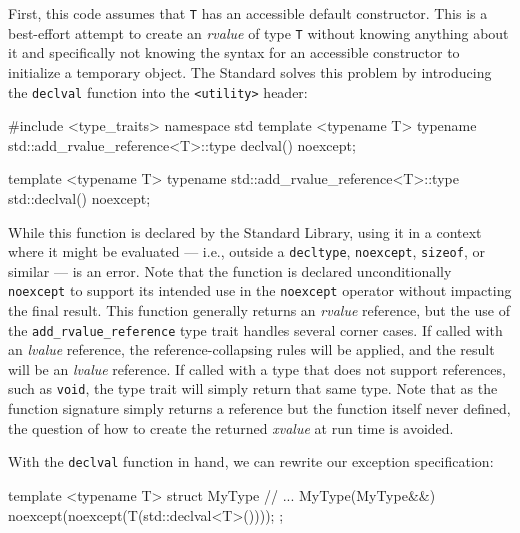 First, this code assumes that \lstinline!T! has an accessible default
constructor. This is a best-effort attempt to create an \emph{rvalue} of
type \lstinline!T! without knowing anything about it and specifically not
knowing the syntax for an accessible constructor to initialize a
temporary object. The Standard solves this problem by introducing the
\lstinline!declval! function into the \lstinline!<utility>! header:

\begin{emcppshiddenlisting}[emcppsbatch={e26,e27}]
#include <type_traits>
namespace std {
template <typename T>
typename std::add_rvalue_reference<T>::type declval() noexcept;
}
\end{emcppshiddenlisting}
\begin{emcppslisting}[emcppsbatch={e26,e27}]
template <typename T>
typename std::add_rvalue_reference<T>::type std::declval() noexcept;
\end{emcppslisting}
    

\noindent While this function is declared by the Standard Library, using it in a
context where it might be evaluated --- i.e., outside a
\lstinline!decltype!, \lstinline!noexcept!, \lstinline!sizeof!, or similar --- is
an error. Note that the function is declared unconditionally
\lstinline!noexcept! to support its intended use in the \lstinline!noexcept!
operator without impacting the final result. This function generally
returns an \emph{rvalue} reference, but the use of the
\lstinline!add_rvalue_reference! type trait handles several corner cases.
If called with an \emph{lvalue} reference, the reference-collapsing
rules will be applied, and the result will be an \emph{lvalue}
reference. If called with a type that does not support references, such
as \lstinline!void!, the type trait will simply return that same type. Note
that as the function signature simply returns a reference but the
function itself never defined, the question of how to create the
returned \emph{xvalue} at run time is avoided.

With the \lstinline!declval! function in hand, we can rewrite our exception
specification:

\begin{emcppslisting}[emcppsbatch=e26]
template <typename T>
struct MyType
{
    // ...
    MyType(MyType&&) noexcept(noexcept(T(std::declval<T>())));
};
\end{emcppslisting}
    

